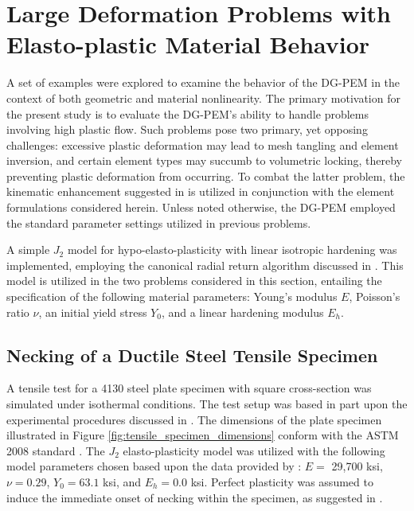 

\section{Large Deformation Problems with Elasto-plastic Material Behavior}

A set of examples were explored to examine the behavior of the DG-PEM in the context of both geometric and material nonlinearity. The primary motivation for the present study is to evaluate the DG-PEM's ability to handle problems involving high plastic flow. Such problems pose two primary, yet opposing challenges: excessive plastic deformation may lead to mesh tangling and element inversion, and certain element types may succumb to volumetric locking, thereby preventing plastic deformation from occurring. To combat the latter problem, the kinematic enhancement suggested in \cite{Rashid:06} is utilized in conjunction with the element formulations considered herein. Unless noted otherwise, the DG-PEM employed the standard parameter settings utilized in previous problems.

A simple $J_2$ model for hypo-elasto-plasticity with linear isotropic hardening was implemented, employing the canonical radial return algorithm discussed in \cite{LSDYNA}. This model is utilized in the two problems considered in this section, entailing the specification of the following material parameters: Young's modulus $E$, Poisson's ratio $\nu$, an initial yield stress $Y_0$, and a linear hardening modulus $E_h$.

\subsection*{Necking of a Ductile Steel Tensile Specimen}

A tensile test for a 4130 steel plate specimen with square cross-section was simulated under isothermal conditions. The test setup was based in part upon the experimental procedures discussed in \cite{Gerberich:62}. The dimensions of the plate specimen illustrated in Figure \ref{fig:tensile_specimen_dimensions} conform with the ASTM 2008 standard \cite{ASTM:08}. The $J_2$ elasto-plasticity model was utilized with the following model parameters chosen based upon the data provided by \cite{ASM:18}: $E =$ 29,700 ksi, $\nu = 0.29$, $Y_0 = 63.1$ ksi, and $E_h = 0.0$ ksi. Perfect plasticity was assumed to induce the immediate onset of necking within the specimen, as suggested in \cite{Kim:05}.

